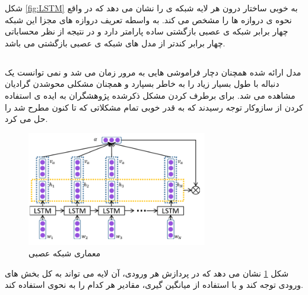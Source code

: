 شکل  \ref{fig:LSTM} به خوبی ساختار درون هر لایه شبکه ی  را نشان می دهد که در واقع نحوه ی دروازه ها را مشخص
می کند. به واسطه تعریف دروازه های مجزا این شبکه چهار برابر شبکه ی عصبی بازگشتی ساده پارامتر دارد و در نتیجه از
نظر محساباتی چهار برابر کندتر از مدل های شبکه ی عصبی بازگشتی می باشد.
\cite{LINDEMANN2021650}

\subsection{}
مدل  ارائه شده همچنان دچار فراموشی هایی به مرور زمان می شد و نمی توانست یک دنباله با طول بسیار زیاد را
به خاطر بسپارد و همچنان مشکلی محوشدن گرادیان مشاهده می شد. برای برطرف کردن مشکل ذکرشده پژوهشگران به ایده ی استفاده کردن از سازوکار توجه رسیدند که به قدر خوبی تمام مشکلاتی که تا کنون مطرح شد را حل می کرد.
\begin{figure}[H]
	\centering
	\includegraphics[width=0.7\textwidth]{figures/Attention.png}
	\caption{معماری شبکه عصبی }
	\label{fig:Attention}
\end{figure}
شکل  \ref{fig:Attention} نشان می دهد که در پردازش هر ورودی، آن لایه می تواند به کل بخش های ورودی توجه کند و با استفاده
از میانگین گیری، مقادیر هر کدام را به نحوی استفاده کند.
\cite{vaswani2017attention}

